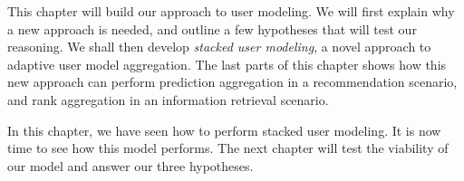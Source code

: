 This chapter will build our approach to user modeling.
We will first explain why a new approach is needed,
and outline a few hypotheses that will test our reasoning.
We shall then develop \emph{stacked user modeling},
a novel approach to adaptive user model aggregation.
The last parts of this chapter shows how this new approach
can perform prediction aggregation in a recommendation scenario,
and rank aggregation in an information retrieval scenario.







\hr

In this chapter, we have seen how to perform stacked user modeling.
It is now time to see how this model performs.
The next chapter will test the viability of 
our model and answer our three hypotheses.


